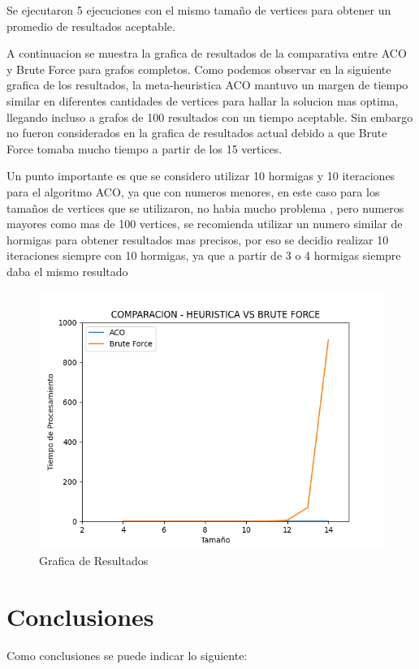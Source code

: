 \documentclass[12pt]{article}
\begin{document}
Se ejecutaron 5 ejecuciones con el mismo tamaño de vertices para obtener un promedio de resultados aceptable.

A continuacion se muestra la grafica de resultados de la comparativa entre ACO y Brute Force para grafos completos.
Como podemos observar en la siguiente grafica de los resultados, la meta-heuristica ACO mantuvo un margen de tiempo similar en
diferentes cantidades de vertices para hallar la solucion mas optima, llegando incluso a grafos de 100 resultados con un tiempo aceptable. Sin embargo
no fueron considerados en la grafica de resultados actual debido a que Brute Force tomaba mucho tiempo a partir de los 15 vertices.

Un punto importante es que se considero utilizar 10 hormigas y 10 iteraciones para el algoritmo ACO, ya que con numeros menores, en este caso para los tamaños de 
vertices que se utilizaron, no habia mucho problema , pero numeros mayores como mas de 100 vertices, se recomienda utilizar un numero similar de hormigas para obtener
resultados mas precisos, por eso se decidio realizar 10 iteraciones siempre con 10 hormigas, ya que a partir de 3 o 4 hormigas siempre daba el mismo resultado


\begin{figure}[H]
\centering
\includegraphics[width=\textwidth]{heuristica_results}
\caption{Grafica de Resultados}
\end{figure}

\section{Conclusiones}
Como conclusiones se puede indicar lo siguiente:
\end{document}
